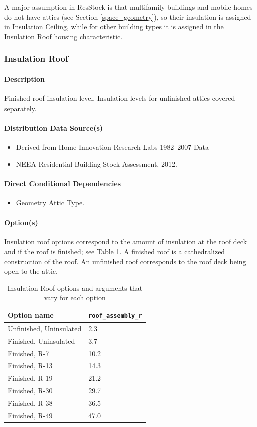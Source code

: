 A major assumption in ResStock is that multifamily buildings and mobile homes do not have attics (see Section \ref{space_geometry}), so their insulation is assigned in Insulation Ceiling, while for other building types it is assigned in the Insulation Roof housing characteristic.


\subsubsection{Insulation Roof}\label{insulation_roof}
\paragraph{Description}
Finished roof insulation level. Insulation levels for unfinished attics covered separately. 

\paragraph{Distribution Data Source(s)}
\begin{itemize}
    \item
      Derived from Home Innovation Research Labs 1982--2007 Data
    \item
      NEEA Residential Building Stock Assessment, 2012.
\end{itemize}
\paragraph{Direct Conditional Dependencies}
 
\begin{itemize}
    \item Geometry Attic Type.
\end{itemize}
\paragraph{Option(s)}
Insulation roof options correspond to the amount of insulation at the roof deck and if the roof is finished; see Table \ref{table:hc_ins_roof}. A finished roof is a cathedralized construction of the roof. An unfinished roof corresponds to the roof deck being open to the attic. 

\begin{longtable}[]{|p{3.5cm}|p{3.5cm}|}
\caption{Insulation Roof options and arguments that vary for each option} \label{table:hc_ins_roof} \\  
\toprule\noalign{}
Option name & \texttt{roof\_assembly\_r} \\
\midrule\noalign{}
\endhead
\bottomrule\noalign{}
\endlastfoot
Unfinished, Uninsulated  & 2.3 \\
Finished, Uninsulated & 3.7 \\
Finished, R-7 & 10.2 \\
Finished, R-13 & 14.3 \\
Finished, R-19 & 21.2 \\
Finished, R-30 & 29.7 \\
Finished, R-38 & 36.5 \\
Finished, R-49 & 47.0 \\
\end{longtable}

